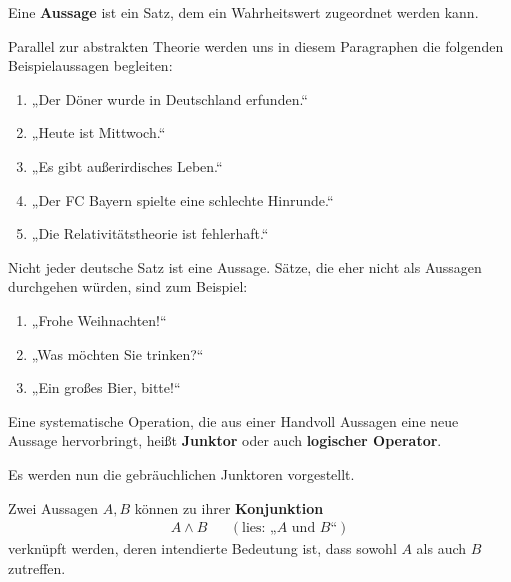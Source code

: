 \begin{defin}[Aussage] \label{def:aussage}
    Eine \textbf{Aussage} ist ein Satz, dem ein Wahrheitswert zugeordnet werden kann.
\end{defin}
	

\begin{bsp}
    Parallel zur abstrakten Theorie werden uns in diesem Paragraphen die folgenden Beispielaussagen begleiten:
    \begin{enumerate}[label={$B_{\arabic*}:=$}, labelindent=1.5em, leftmargin=*, series=propbsp]
        \item „Der Döner wurde in Deutschland erfunden.“
        \item „Heute ist Mittwoch.“
        \item „Es gibt außerirdisches Leben.“
        \item „Der FC Bayern spielte eine schlechte Hinrunde.“
        \item „Die Relativitätstheorie ist fehlerhaft.“
    \end{enumerate}
    Nicht jeder deutsche Satz ist eine Aussage. Sätze, die eher nicht als Aussagen durchgehen würden, sind zum Beispiel: \quad
    \begin{enumerate}[resume*]
        \item[] „Frohe Weihnachten!“
        \item[] „Was möchten Sie trinken?“
        \item[] „Ein großes Bier, bitte!“
    \end{enumerate}
\end{bsp}


\begin{defin}[Junktor] 
    Eine systematische Operation, die aus einer Handvoll Aussagen eine neue Aussage hervorbringt, heißt \textbf{Junktor} oder auch \textbf{logischer Operator}.
\end{defin}


Es werden nun die gebräuchlichen Junktoren vorgestellt.


\begin{defin} 
    Zwei Aussagen $A,B$ können zu ihrer \textbf{Konjunktion}
    \begin{align*}
        A\land B && (\text{lies: „$A$ und $B$“})
    \end{align*}
    verknüpft werden, deren intendierte Bedeutung ist, dass sowohl $A$ als auch $B$ zutreffen.
\end{defin}


